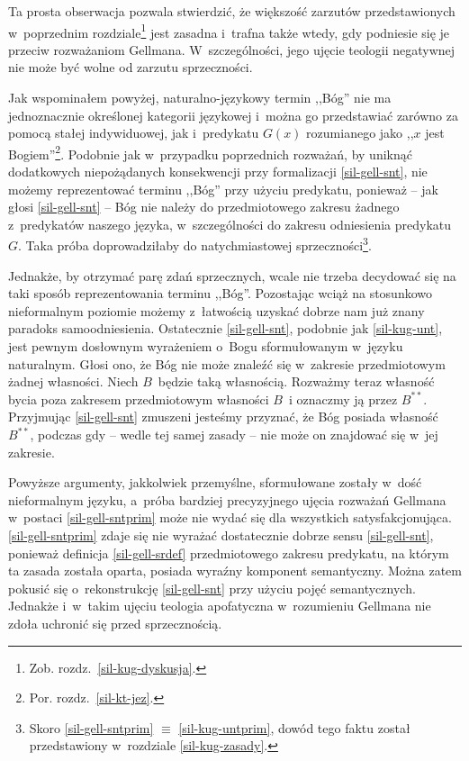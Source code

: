 Ta prosta obserwacja pozwala stwierdzić, że większość zarzutów przedstawionych w~poprzednim rozdziale\footnote{Zob. rozdz.~\ref{sil-kug-dyskusja}.} jest zasadna i~trafna także wtedy, gdy podniesie się je przeciw rozważaniom Gellmana. W~szczególności, jego ujęcie teologii negatywnej nie może być wolne od zarzutu sprzeczności.

Jak wspominałem powyżej, naturalno-językowy termin ,,Bóg'' nie ma jednoznacznie określonej kategorii językowej i~można go przedstawiać zarówno za pomocą stałej indywiduowej, jak i~predykatu $G(x)$ rozumianego jako ,,$x$ jest Bogiem''\footnote{Por. rozdz.~\ref{sil-kt-jez}.}. Podobnie jak w~przypadku poprzednich rozważań, by uniknąć dodatkowych niepożądanych konsekwencji przy formalizacji \ref{sil-gell-snt}, nie możemy reprezentować terminu ,,Bóg'' przy użyciu predykatu, ponieważ -- jak głosi \ref{sil-gell-snt} -- Bóg nie należy do przedmiotowego zakresu żadnego z~predykatów naszego języka, w~szczególności do zakresu odniesienia predykatu $G$. Taka próba doprowadziłaby do natychmiastowej sprzeczności\footnote{Skoro \ref{sil-gell-sntprim} $\equiv$ \ref{sil-kug-untprim}, dowód tego faktu został przedstawiony w~rozdziale \ref{sil-kug-zasady}.}.

Jednakże, by otrzymać parę zdań sprzecznych, wcale nie trzeba decydować się na taki sposób reprezentowania terminu ,,Bóg''. Pozostając wciąż na stosunkowo nieformalnym poziomie możemy z~łatwością uzyskać dobrze nam już znany paradoks samoodniesienia. Ostatecznie \ref{sil-gell-snt}, podobnie jak \ref{sil-kug-unt}, jest pewnym dosłownym wyrażeniem o~Bogu sformułowanym w~języku naturalnym. Głosi ono, że Bóg nie może znaleźć się w~zakresie przedmiotowym żadnej własności. Niech $B$~będzie taką własnością. Rozważmy teraz własność bycia poza zakresem przedmiotowym własności $B$~i oznaczmy ją przez $B^{**}$. Przyjmując \ref{sil-gell-snt} zmuszeni jesteśmy przyznać, że Bóg posiada własność $B^{**}$, podczas gdy -- wedle tej samej zasady -- nie może on znajdować się w~jej zakresie.

Powyższe argumenty, jakkolwiek przemyślne, sformułowane zostały w~dość nieformalnym języku, a~próba bardziej precyzyjnego ujęcia rozważań Gellmana w~postaci \ref{sil-gell-sntprim} może nie wydać się dla wszystkich satysfakcjonująca. \ref{sil-gell-sntprim} zdaje się nie wyrażać dostatecznie dobrze sensu \ref{sil-gell-snt}, ponieważ definicja \ref{sil-gell-srdef} przedmiotowego zakresu predykatu, na którym ta zasada została oparta, posiada wyraźny komponent semantyczny. Można zatem pokusić się o~rekonstrukcję \ref{sil-gell-snt} przy użyciu pojęć semantycznych. Jednakże i~w~takim ujęciu teologia apofatyczna w~rozumieniu Gellmana nie zdoła uchronić się przed sprzecznością.

